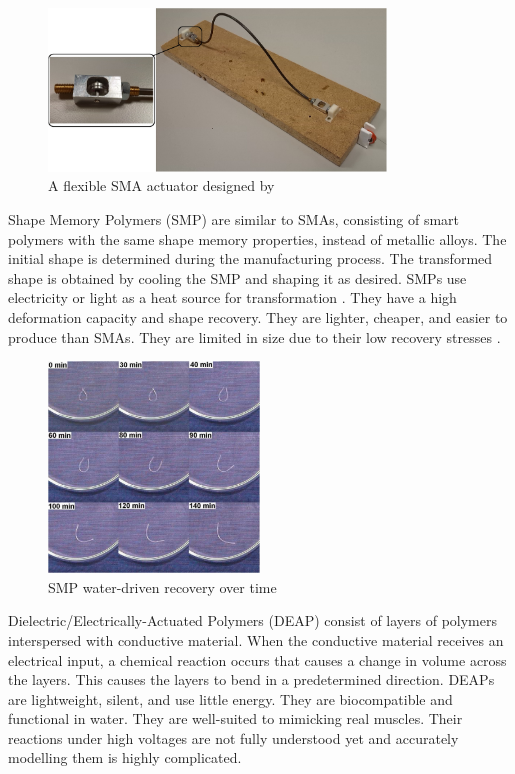 \begin{figure}[H]
	\centering
	\includegraphics[width=0.8\textwidth]{SMA.png}
	\caption[A flexible SMA actuator]{A flexible SMA actuator designed by \cite{Villoslada2014}}
	\label{fig:sma}
\end{figure}

Shape Memory Polymers (SMP) are similar to SMAs, consisting of smart polymers with the same shape memory properties, instead of metallic alloys. The initial shape is determined during the manufacturing process. The transformed shape is obtained by cooling the SMP and shaping it as desired. SMPs use electricity or light as a heat source for transformation \citep{Behl2007}. They have a high deformation capacity and shape recovery. They are lighter, cheaper, and easier to produce than SMAs. They are limited in size due to their low recovery stresses \citep{Huang2005, Rodriguez2016, Behl2007}.

\begin{figure}[H]
	\centering
	\includegraphics[width=0.5\textwidth]{SMP.png}
	\caption[SMP water-driven recovery]{SMP water-driven recovery over time \citep{Huang2005}}
	\label{fig:smp}
\end{figure}

Dielectric/Electrically-Actuated Polymers (DEAP) consist of layers of polymers interspersed with conductive material. When the conductive material receives an electrical input, a chemical reaction occurs that causes a change in volume across the layers. This causes the layers to bend in a predetermined direction. DEAPs are lightweight, silent, and use little energy. They are biocompatible and functional in water. They are well-suited to mimicking real muscles. Their reactions under high voltages are not fully understood yet and accurately modelling them is highly complicated. \citep{Mutlu2014}

